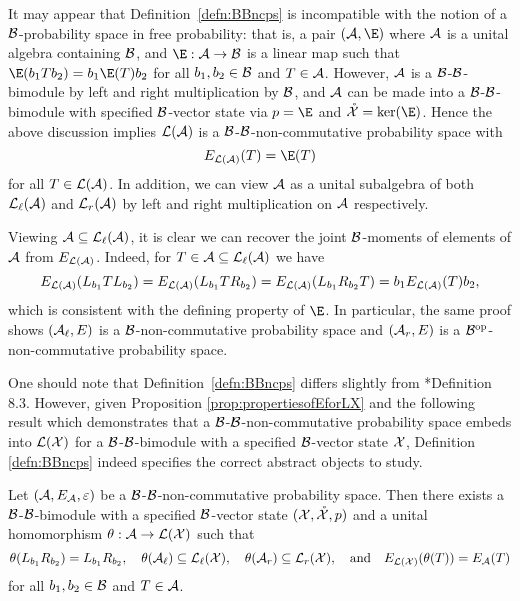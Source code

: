 It may appear that Definition~\ref{defn:BBncps} is incompatible with the notion of a $\mathcal{B}$-probability space in free probability: that is, a pair $(\A, \E)$ where $\mathcal{A}$ is a unital algebra containing $\mathcal{B}$, and $\E : \A \to \cB$ is a linear map such that $\E(b_1Tb_2) = b_1\E(T)b_2$ for all $b_1, b_2 \in \mathcal{B}$ and $T \in \mathcal{A}$.
However, $\mathcal{A}$ is a $\mathcal{B}$-$\mathcal{B}$-bimodule by left and right multiplication by $\mathcal{B}$, and $\mathcal{A}$ can be made into a $\mathcal{B}$-$\mathcal{B}$-bimodule with specified $\mathcal{B}$-vector state via $p = \E$ and $\ocX = \ker(\E)$.
Hence the above discussion implies $\mathcal{L}(\mathcal{A})$ is a $\mathcal{B}$-$\mathcal{B}$-non-commutative probability space with
\[
	E_{\cL(\A)}(T) = \E(T)
\]
for all $T \in \mathcal{L}(\mathcal{A})$.
In addition, we can view $\mathcal{A}$ as a unital subalgebra of both $\mathcal{L}_\ell(\mathcal{A})$ and $\mathcal{L}_r(\mathcal{A})$ by left and right multiplication on $\mathcal{A}$ respectively.


Viewing $\mathcal{A} \subseteq \mathcal{L}_\ell(\mathcal{A})$, it is clear we can recover the joint $\mathcal{B}$-moments of elements of $\mathcal{A}$ from $E_{\mathcal{L}(\mathcal{A})}$.
Indeed, for $T \in \mathcal{A} \subseteq \mathcal{L}_\ell(\mathcal{A})$ we have
\[
	E_{\mathcal{L}(\mathcal{A})}(L_{b_1} T L_{b_2}) = E_{\mathcal{L}(\mathcal{A})}(L_{b_1} T R_{b_2}) = E_{\mathcal{L}(\mathcal{A})}(L_{b_1} R_{b_2} T) = b_1 E_{\mathcal{L}(\mathcal{A})}(T) b_2,
\]
which is consistent with the defining property of $\E$.
In particular, the same proof shows $(\mathcal{A}_\ell, E)$ is a $\mathcal{B}$-non-commutative probability space and $(\mathcal{A}_r, E)$ is a $\mathcal{B}^{\mathrm{op}}$-non-commutative probability space.

One should note that Definition~\ref{defn:BBncps} differs slightly from \cite{voiculescu2014free}*{Definition 8.3}.
However, given Proposition \ref{prop:propertiesofEforLX} and the following result which demonstrates that a $\mathcal{B}$-$\mathcal{B}$-non-commutative probability space embeds into $\mathcal{L}(\mathcal{X})$ for a $\mathcal{B}$-$\mathcal{B}$-bimodule with a specified $\mathcal{B}$-vector state $\mathcal{X}$, Definition \ref{defn:BBncps} indeed specifies the correct abstract objects to study.

\begin{theorem}
	\label{thm:representingbbncps}
	Let $(\mathcal{A}, E_{\mathcal{A}}, \varepsilon)$ be a $\mathcal{B}$-$\mathcal{B}$-non-commutative probability space.
	Then there exists a $\mathcal{B}$-$\mathcal{B}$-bimodule with a specified $\mathcal{B}$-vector state $(\mathcal{X}, \mathring{\mathcal{X}}, p)$ and a unital homomorphism $\theta : \mathcal{A} \to \mathcal{L}(\mathcal{X})$ such that 
	\[
		\theta(L_{b_1} R_{b_2}) = L_{b_1} R_{b_2}, \quad \theta(\mathcal{A}_\ell) \subseteq \mathcal{L}_\ell(\mathcal{X}), \quad
		\theta(\mathcal{A}_r) \subseteq \mathcal{L}_r(\mathcal{X}), \quad
		\text{and} \quad
		E_{\mathcal{L}(\mathcal{X})}(\theta(T)) = E_{\mathcal{A}}(T)
	\]
	for all $b_1, b_2 \in \mathcal{B}$ and $T \in \mathcal{A}$.
\end{theorem}

